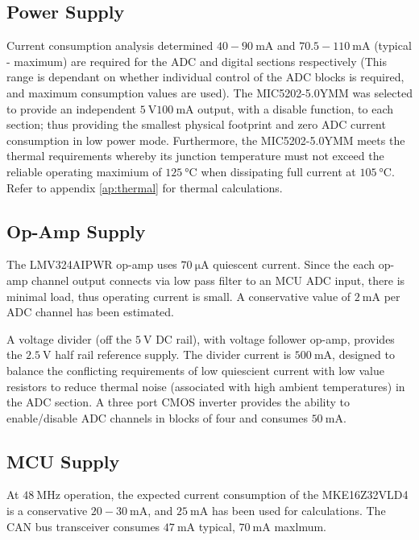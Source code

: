 \subsection{Power Supply}
Current consumption analysis determined $40 - \SI{90}{\milli\ampere}$ and $70.5 - \SI{110}{\milli\ampere}$ (typical - maximum) are required for the ADC and digital sections respectively
(This range is dependant on whether individual control of the ADC blocks is required, and maximum consumption values are used).
The MIC5202-5.0YMM was selected to provide an independent $\SI{5}{\volt} \SI{100}{\milli\ampere}$ output, with a disable function, to each section; thus providing the smallest physical footprint and zero ADC current consumption in low power mode.
Furthermore, the MIC5202-5.0YMM meets the thermal requirements whereby its junction temperature must not exceed the reliable operating maximium of $\SI{125}{\degreeCelsius}$ when dissipating full current at $\SI{105}{\degreeCelsius}$.
Refer to appendix \ref{ap:thermal} for thermal calculations.
 
\subsection{Op-Amp Supply}
The LMV324AIPWR op-amp uses $\SI{70}{\micro\ampere}$ quiescent current.
Since the each op-amp channel output connects via low pass filter to an MCU ADC input, there is minimal load, thus operating current is small.
A conservative value of $\SI{2}{\milli\ampere}$ per ADC channel has been estimated.

A voltage divider (off the $\SI{5}{\volt}$ DC rail), with voltage follower op-amp, provides the $\SI{2.5}{\volt}$ half rail reference supply.
The divider current is $\SI{500}{\milli\ampere}$, designed to balance the conflicting requirements of low quiescient current with low value resistors to reduce thermal noise (associated with high ambient temperatures) in the ADC section.
A three port CMOS inverter provides the ability to enable/disable ADC channels in blocks of four and consumes $\SI{50}{\milli\ampere}$.

\subsection{MCU Supply}
At $\SI{48}{\mega\hertz}$ operation, the expected current consumption of the MKE16Z32VLD4 is a conservative $20 - \SI{30}{\milli\ampere}$, and $\SI{25}{\milli\ampere}$ has been used for calculations.
The CAN bus transceiver consumes $\SI{47}{\milli\ampere}$ typical, $\SI{70}{\milli\ampere}$ maxlmum.


